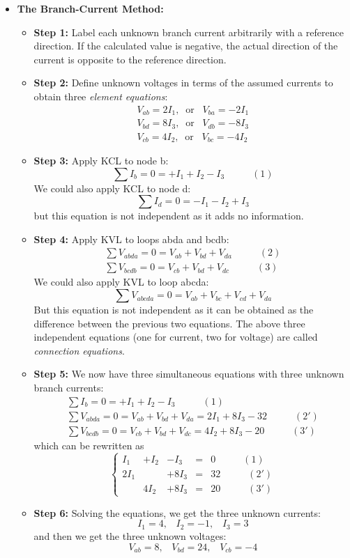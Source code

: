 \begin{itemize}
\item {\bf The Branch-Current Method:} 
  \begin{itemize}
  \item {\bf Step 1:} Label each unknown branch current arbitrarily with a 
    reference direction. If the calculated value is negative, the actual
    direction of the current is opposite to the reference direction.
  \item {\bf Step 2:} Define unknown voltages in terms of the assumed currents
    to obtain three {\em element equations}:
    \[ \begin{array}{l}
	V_{ab}=2I_1,\;\;\mbox{or}\;\;\;V_{ba}=-2I_1 \\
	V_{bd}=8I_3,\;\;\mbox{or}\;\;\;V_{db}=-8I_3 \\
	V_{cb}=4I_2,\;\;\mbox{or}\;\;\;V_{bc}=-4I_2 \end{array} \]
  \item {\bf Step 3:} Apply KCL to node b:
    \[ \sum I_b=0=+I_1+I_2-I_3\;\;\;\;\;\;\;\;\;\;(1)		\]
    We could also apply KCL to node d:
    \[ \sum I_d=0=-I_1-I_2+I_3	\]
    but this equation is not independent as it adds no information.
  \item {\bf Step 4:} Apply KVL to loops abda and bcdb:	
    \[ \begin{array}{r} 
	\sum V_{abda}=0=V_{ab}+V_{bd}+V_{da}\;\;\;\;\;\;\;\;\;\;(2)	\\
	\sum V_{bcdb}=0=V_{cb}+V_{bd}+V_{dc}\;\;\;\;\;\;\;\;\;\;(3)	
    \end{array} \]
    We could also apply KVL to loop abcda:
    \[ \sum V_{abcda}=0=V_{ab}+V_{bc}+V_{cd}+V_{da}	\]
    But this equation is not independent as it can be obtained as the
    difference between the previous two equations. 
    The above three independent equations (one for current, two for
    voltage) are called {\em connection equations}.
  \item {\bf Step 5:} We now have three simultaneous equations with three 
    unknown branch currents:
    \[ \begin{array}{r}
        \sum I_b=0=+I_1+I_2-I_3\;\;\;\;\;\;\;\;\;\;(1)	\\
	\sum V_{abda}=0=V_{ab}+V_{bd}+V_{da}=2I_1+8I_3-32\;\;\;\;\;\;\;\;\;\;(2') \\
	\sum V_{bcdb}=0=V_{cb}+V_{bd}+V_{dc}=4I_2+8I_3-20\;\;\;\;\;\;\;\;\;\;(3')
	\end{array} \]
    which can be rewritten as
    \[ \left\{ \begin{array}{rrrrr}
	  I_1 & +I_2 & -I_3& = &  0\;\;\;\;\;\;\;\;\;\;(1) \\
	 2I_1 &    & +8I_3 & = & 32\;\;\;\;\;\;\;\;\;\;(2') \\
	      &4I_2& +8I_3 & = & 20\;\;\;\;\;\;\;\;\;\;(3') \end{array} \right. \]
  \item {\bf Step 6: } Solving the equations, we get the three unknown currents:
    \[ I_1=4,\;\;\;I_2=-1,\;\;\;I_3=3	\]
    and then we get the three unknown voltages:
    \[ V_{ab}=8,\;\;\;V_{bd}=24,\;\;\;V_{cb}=-4	\]
  \end{itemize}


\end{itemize}
